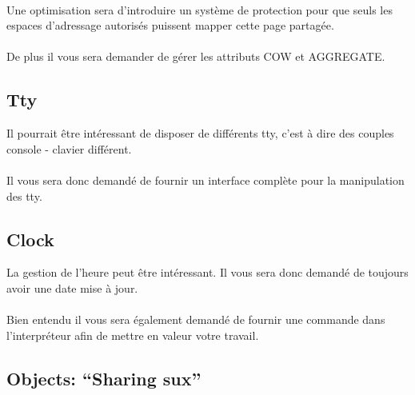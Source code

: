 \documentclass[10pt,a4wide]{article}
\begin{document}
\paragraph{}

Une optimisation sera d'introduire un syst\`eme de protection pour que
seuls les espaces d'adressage autoris\'es puissent mapper cette page
partag\'ee.

\paragraph{}

De plus il vous sera demander de g\'erer les attributs COW et AGGREGATE.

\subsection{Tty}

Il pourrait \^etre int\'eressant de disposer de diff\'erents tty, c'est \`a
dire des couples console - clavier diff\'erent.

\paragraph{}

Il vous sera donc demand\'e de fournir un interface compl\`ete pour la
manipulation des tty.

\subsection{Clock}

La gestion de l'heure peut \^etre int\'eressant. Il vous sera donc
demand\'e de toujours avoir une date mise \`a jour.

\paragraph{}

Bien entendu il vous sera \'egalement demand\'e de fournir une commande
dans l'interpr\'eteur afin de mettre en valeur votre travail.

\subsection{Objects: ``Sharing sux''}

\paragraph{}
\end{document}
